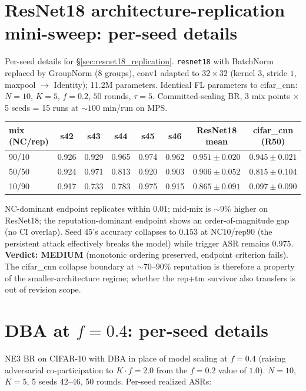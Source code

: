 \documentclass{article}
\begin{document}
\section{ResNet18 architecture-replication mini-sweep: per-seed details}
\label{app:resnet18_replication_details}

Per-seed details for §\ref{sec:resnet18_replication}. \texttt{resnet18} with BatchNorm replaced by GroupNorm (8 groups), conv1 adapted to $32\times 32$ (kernel $3$, stride $1$, maxpool $\to$ Identity); 11.2M parameters. Identical FL parameters to cifar\_cnn: $N{=}10$, $K{=}5$, $f{=}0.2$, $50$ rounds, $\tau=5$. Committed-scaling BR, 3 mix points $\times$ 5 seeds = 15 runs at $\sim 100$ min/run on MPS.

\begin{center}\small
\begin{tabular}{l|ccccc|c|c}
\toprule
mix (NC/rep) & s42 & s43 & s44 & s45 & s46 & ResNet18 mean & cifar\_cnn (R50) \\
\midrule
90/10 & 0.926 & 0.929 & 0.965 & 0.974 & 0.962 & $\mathbf{0.951 \pm 0.020}$ & $0.945 \pm 0.021$ \\
50/50 & 0.924 & 0.971 & 0.813 & 0.920 & 0.903 & $\mathbf{0.906 \pm 0.052}$ & $0.815 \pm 0.104$ \\
10/90 & 0.917 & 0.733 & 0.783 & 0.975 & 0.915 & $\mathbf{0.865 \pm 0.091}$ & $\mathbf{0.097 \pm 0.090}$ \\
\bottomrule
\end{tabular}
\end{center}

NC-dominant endpoint replicates within $0.01$; mid-mix is $\sim 9\%$ higher on ResNet18; the reputation-dominant endpoint shows an order-of-magnitude gap (no CI overlap). Seed 45's accuracy collapses to $0.153$ at NC10/rep90 (the persistent attack effectively breaks the model) while trigger ASR remains $0.975$. \textbf{Verdict: MEDIUM} (monotonic ordering preserved, endpoint criterion fails). The cifar\_cnn collapse boundary at $\sim 70$--$90\%$ reputation is therefore a property of the smaller-architecture regime; whether the rep+tm survivor also transfers is out of revision scope.

\section{DBA at $f{=}0.4$: per-seed details}
\label{app:dba_f04}

NE3 BR on CIFAR-10 with DBA in place of model scaling at $f{=}0.4$ (raising adversarial co-participation to $K \cdot f = 2.0$ from the $f{=}0.2$ value of $1.0$). $N{=}10$, $K{=}5$, 5 seeds 42--46, 50 rounds. Per-seed realized ASRs:
\end{document}
